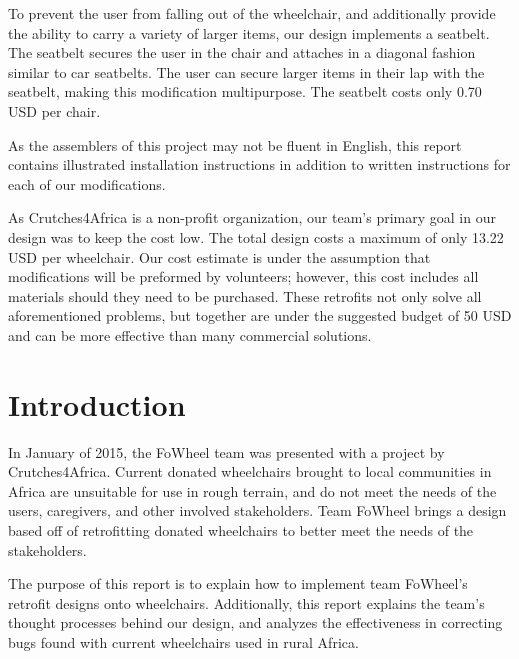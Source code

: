 \documentclass[12pt]{report}
\begin{document}
To prevent the user from falling out of the wheelchair, and additionally
provide the ability to carry a variety of larger items, our design implements a
seatbelt. The seatbelt secures the user in the chair and attaches in a diagonal fashion similar
to car seatbelts. The user can secure larger items in their lap with the
seatbelt, making this modification multipurpose. The seatbelt costs only 0.70
USD per chair.

As the assemblers of this project may not be fluent in English, this report
contains illustrated installation instructions in addition to written
instructions for each of our modifications.

As Crutches4Africa is a non-profit organization, our team's primary goal in
our design was to keep the cost low. The total design costs a maximum of only
13.22 USD per wheelchair. Our cost estimate is under the assumption that modifications will
be preformed by volunteers; however, this cost includes all materials should
they need to be purchased. These retrofits not only solve all aforementioned
problems, but together are under the suggested budget of 50 USD and can be more
effective than many commercial solutions.
\clearpage

\tableofcontents
\begin{minipage}{\textwidth}
\listoffigures
\end{minipage}
\begin{minipage}{\textwidth}
\listoftables
\end{minipage}

\pagestyle{fancy}

\chapter{Introduction}

In January of 2015, the FoWheel team was presented with a project by
Crutches4Africa. Current donated wheelchairs brought to local communities in
Africa are unsuitable for use in rough terrain, and do not meet the needs of
the users, caregivers, and other involved stakeholders. Team FoWheel brings a
design based off of retrofitting donated wheelchairs to better meet the needs
of the stakeholders.

The purpose of this report is to explain how to implement team FoWheel’s
retrofit designs onto wheelchairs. Additionally, this report explains the team's
thought processes behind our design, and analyzes the effectiveness in
correcting bugs found with current wheelchairs used in rural Africa.
\end{document}

